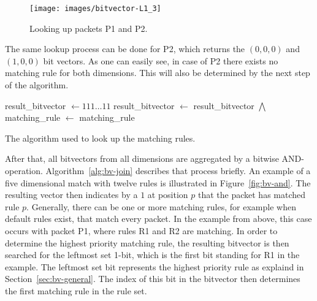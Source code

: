 \documentclass[a4paper,
		12pt,
		parskip=full,
		titlepage
		]{scrartcl}
\begin{document}
\begin{figure}
\centering
\texttt{[image: images/bitvector-L1\_3]}
\caption{Looking up packets P1 and P2.}
\label{fig:bv-lookup}
\end{figure}

The same lookup process can be done for P2, which returns the $(0, 0, 0)$ and $(1, 0, 0)$ bit vectors.
As one can easily see, in case of P2 there exists no matching rule for both dimensions.
This will also be determined by the next step of the algorithm.

\begin{algorithm}
\begin{algorithmic}
    \State result\_bitvector $\gets 111\ldots 11$
        \State result\_bitvector $\gets$ result\_bitvector $\bigwedge$ 
    \EndFor
    \State matching\_rule $\gets$ 
    \State \Return matching\_rule
\EndFunction
\end{algorithmic}
\caption{The algorithm used to look up the matching rules.}
\label{alg:bv-join}
\end{algorithm}

After that, all bitvectors from all dimensions are aggregated by a bitwise AND-operation.
Algorithm~\ref{alg:bv-join} describes that process briefly.
An example of a five dimensional match with twelve rules is illustrated in Figure~\ref{fig:bv-and}.
The resulting vector then indicates by a $1$ at position $p$ that the packet has matched rule $p$.
Generally, there can be one or more matching rules, for example when default rules exist, that match every packet.
In the example from above, this case occurs with packet P1, where rules R1 and R2 are matching.
In order to determine the highest priority matching rule, the resulting 
bitvector is then searched for the leftmost set 1-bit, which is the first bit standing for R1 in the example.
The leftmost set bit represents the highest priority rule as explaind in Section~\ref{sec:bv-general}.
The index of this bit in the bitvector then determines the first matching rule in the rule set.
\end{document}
